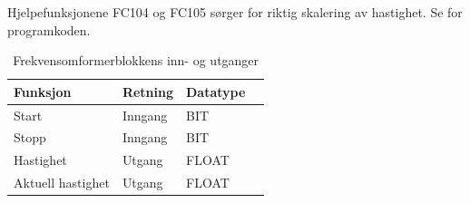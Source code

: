 \documentclass[Visionprosjekt.tex]{subfiles}
\begin{document}

 Hjelpefunksjonene FC104 og FC105 sørger for riktig skalering av hastighet. %
Se  for programkoden.




\begin{table}[ht]%
    \centering
    \caption{Frekvensomformerblokkens inn- og utganger}
    \renewcommand\arraystretch{1.2}
    \begin{tabular}{ll>{\ttfamily}l>{\raggedright\arraybackslash}l}
        \toprule
        Funksjon	        &  Retning & \normalfont Datatype   \\
        \midrule
        Start               &  Inngang  & BIT   \\
        Stopp               &  Inngang  & BIT     \\
        Hastighet           &  Utgang   & FLOAT   \\
        Aktuell hastighet   &  Utgang   & FLOAT   \\
        \bottomrule
	\end{tabular}
    \label{tab:frekvblokk}
\end{table}














%
%


%
%
%
%
\end{document}
